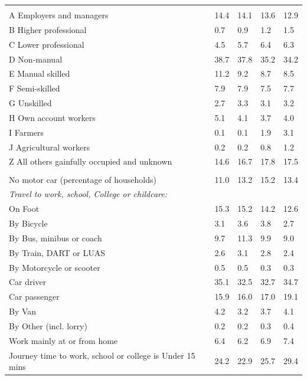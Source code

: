 \documentclass{article}
\begin{document}
\begin{table}[h]
\begin{tabular}{KTTTT}
\hline
    \\ 
    \hline
A Employers and managers & 14.4& 14.1& 13.6& 12.9\\
B Higher professional & 0.7& 0.9& 1.2& 1.5\\
C Lower professional & 4.5& 5.7& 6.4& 6.3\\
D Non-manual & 38.7& 37.8& 35.2& 34.2\\
E Manual skilled & 11.2&  9.2&  8.7&  8.5\\
F Semi-skilled & 7.9& 7.9& 7.5& 7.7\\
G Unskilled & 2.7& 3.3& 3.1& 3.2\\
H Own account workers & 5.1& 4.1& 3.7& 4.0\\
I Farmers & 0.1& 0.1& 1.9& 3.1\\
J Agricultural workers & 0.2& 0.2& 0.8& 1.2\\
Z All others gainfully occupied and unknown & 14.6& 16.7& 17.8& 17.5\\
\hline
{}\hline
    \\ 
    \hline
No motor car (percentage of households) & 11.0& 13.2& 15.2& 
13.4\\
    \hline 
\emph{Travel to work, school, College or childcare:} & & & \\
\quad On Foot & 15.3& 15.2& 14.2& 12.6\\ 
\quad By Bicycle & 3.1& 3.6& 3.8& 2.7\\ 
\quad By Bus, minibus or coach &  9.7& 11.3&  9.9&  9.0\\
\quad By Train, DART or LUAS & 2.6& 3.1& 2.8& 2.4\\
\quad By Motorcycle or scooter & 0.5& 0.5& 0.3& 0.3\\
\quad Car driver & 35.1 & 32.5& 32.7& 34.7\\
\quad Car passenger & 15.9& 16.0& 17.0& 19.1\\
\quad By Van & 4.2& 3.2& 3.7& 4.1\\
\quad By Other (incl. lorry) & 0.2& 0.2& 0.3& 0.4\\
    \hline
Work mainly at or from home & 6.4& 6.2& 6.9& 7.4\\
Journey time to work, school or college is Under 15 mins & 24.2& 22.9& 25.7& 29.4\\

\end{tabular}
\end{table}
\end{document}
